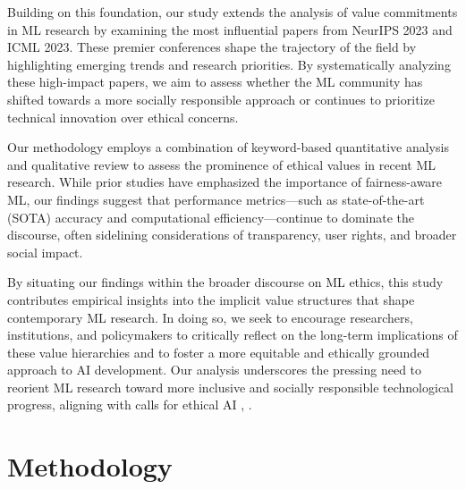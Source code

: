 \documentclass{article}
\begin{document}
Building on this foundation, our study extends the analysis of value commitments in ML research by examining the most influential papers from NeurIPS 2023 and ICML 2023. These premier conferences shape the trajectory of the field by highlighting emerging trends 
and research priorities. By systematically analyzing these high-impact papers, we aim to assess whether the ML community has shifted towards a more socially responsible approach or continues to prioritize technical innovation over 
ethical concerns.

Our methodology employs a combination of keyword-based quantitative analysis and qualitative review to assess the prominence of ethical values in recent ML research. While prior studies \cite{geyik2019fairness} have emphasized the 
importance of fairness-aware ML, our findings suggest that performance metrics—such as state-of-the-art (SOTA) accuracy and computational efficiency—continue to dominate the discourse, often sidelining considerations of transparency, 
user rights, and broader social impact.

By situating our findings within the broader discourse on ML ethics, this study contributes empirical insights into the implicit value structures that shape contemporary ML research. In doing so, we seek to encourage 
researchers, institutions, and policymakers to critically reflect on the long-term implications of these value hierarchies and to foster a more equitable and ethically grounded approach to AI development. Our analysis underscores 
the pressing need to reorient ML research toward more inclusive and socially responsible technological progress, aligning with calls for ethical AI \cite{floridi2022unified}, \cite{kalluri2020don}.

\section{Methodology}
\end{document}
